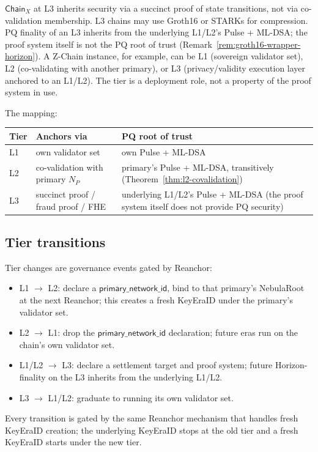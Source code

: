 \begin{remark}
\label{rem:l3-model}
$\mathsf{Chain}_X$ at L3 inherits security via a succinct proof of state transitions, not via co-validation membership. L3 chains may use Groth16 or STARKs for compression. PQ finality of an L3 inherits from the underlying L1/L2's Pulse + ML-DSA; the proof system itself is not the PQ root of trust (Remark~\ref{rem:groth16-wrapper-horizon}). A Z-Chain instance, for example, can be L1 (sovereign validator set), L2 (co-validating with another primary), or L3 (privacy/validity execution layer anchored to an L1/L2). The tier is a deployment role, not a property of the proof system in use.
\end{remark}

The mapping:

\begin{tabular}{@{}p{}p{}p{}@{}}
  \toprule
  \textbf{Tier} & \textbf{Anchors via} & \textbf{PQ root of trust} \\
  \midrule
  L1 & own validator set & own Pulse + ML-DSA \\
  L2 & co-validation with primary $N_P$ & primary's Pulse + ML-DSA, transitively (Theorem~\ref{thm:l2-covalidation}) \\
  L3 & succinct proof / fraud proof / FHE & underlying L1/L2's Pulse + ML-DSA (the proof system itself does not provide PQ security) \\
  \bottomrule
\end{tabular}

\subsection{Tier transitions}

Tier changes are governance events gated by Reanchor:
\begin{itemize}[leftmargin=2em,nosep]
  \item L1 $\to$ L2: declare a $\mathsf{primary\_network\_id}$, bind to that primary's NebulaRoot at the next Reanchor; this creates a fresh KeyEraID under the primary's validator set.
  \item L2 $\to$ L1: drop the $\mathsf{primary\_network\_id}$ declaration; future eras run on the chain's own validator set.
  \item L1/L2 $\to$ L3: declare a settlement target and proof system; future Horizon-finality on the L3 inherits from the underlying L1/L2.
  \item L3 $\to$ L1/L2: graduate to running its own validator set.
\end{itemize}
Every transition is gated by the same Reanchor mechanism that handles fresh KeyEraID creation; the underlying KeyEraID stops at the old tier and a fresh KeyEraID starts under the new tier.

